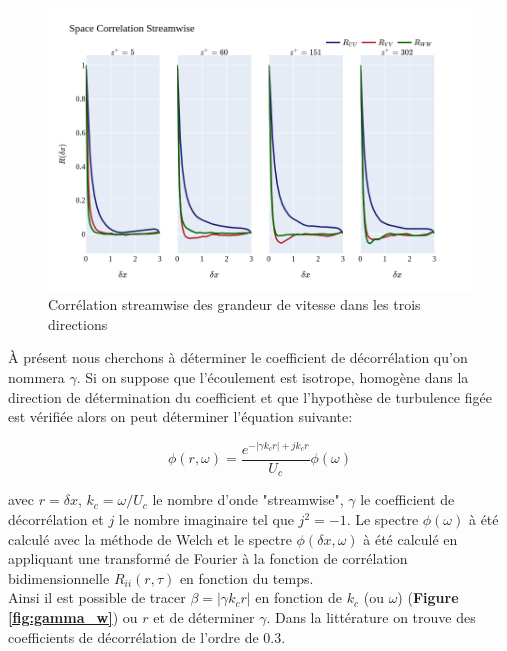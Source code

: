 \documentclass[12pt]{article}
\theoremstyle{plain}
\theoremstyle{remark}
\begin{document}
\begin{figure}[h!]
	\begin{center}
		\includegraphics[width=0.9\linewidth]{../../output/figures/channel_wrles_retau395/split_time/space_correlation/streamwise.png}
		\caption{Corrélation streamwise des grandeur de vitesse dans les trois directions}
		\label{fig:space_spectra}
	\end{center}
\end{figure}

À présent nous cherchons à déterminer le coefficient de décorrélation qu'on nommera $\gamma$. Si on suppose que l'écoulement est isotrope, homogène dans la direction de détermination du coefficient et que l'hypothèse de turbulence figée est vérifiée alors on peut déterminer l'équation suivante: 

\begin{equation}
	\phi(r, \omega) = \frac{e^{-|\gamma k_c r| + jk_cr}}{U_c}\phi(\omega)
	\label{eq:funct}
\end{equation} 

avec $r = \delta x$, $k_c=\omega/U_c$ le nombre d'onde "streamwise", $\gamma$ le coefficient de décorrélation et $j$ le nombre imaginaire tel que $j^2=-1$. Le spectre $\phi(\omega)$ à été calculé avec la méthode de Welch et le spectre $\phi(\delta x, \omega)$ à été calculé en appliquant une transformé de Fourier à la fonction de corrélation bidimensionnelle $R_{ii}(r,\tau)$ en fonction du temps.\\
Ainsi il est possible de tracer $\beta = |\gamma k_c r|$ en fonction de $k_c$ (ou $\omega$) ({\bf Figure \ref{fig:gamma_w}}) ou $r$ et de déterminer $\gamma$. Dans la littérature on trouve des coefficients de décorrélation de l'ordre de $0.3$.
\end{document}
